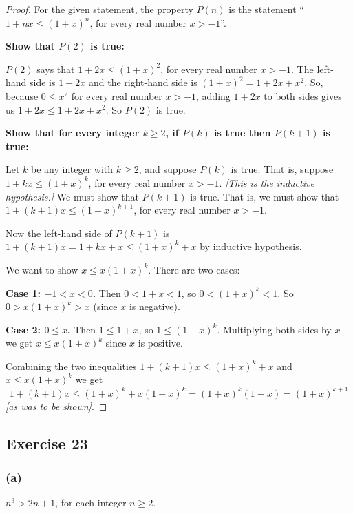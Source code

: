 \documentclass[14pt]{extarticle}
\begin{document}
\begin{proof}
    For the given statement, the property $P(n)$ is the statement ``$1 + nx \leq (1 + x)^n$, for every real number $x > -1$''.

    {\bf Show that $P(2)$ is true:}

    $P(2)$ says that $1 + 2x \leq (1 + x)^2$, for every real number $x > -1$. The left-hand side is $1 + 2x$ and the right-hand side is $(1+x)^2 = 1 + 2x + x^2$. So, because $0 \leq x^2$ for every real number $x > -1$, adding $1 + 2x$ to both sides gives us $1 + 2x \leq 1 + 2x + x^2$. So $P(2)$ is true.

        {\bf Show that for every integer $k \geq 2$, if $P(k)$ is true then $P(k + 1)$ is true:}

    Let $k$ be any integer with $k \geq 2$, and suppose $P(k)$ is true. That is, suppose $1 + kx \leq (1 + x)^k$, for every real number $x > -1$. {\it [This is the inductive hypothesis.]} We must show that $P(k + 1)$ is true. That is, we must show that $1 + (k + 1)x \leq (1 + x)^{k + 1}$, for every real number $x > -1$.

    Now the left-hand side of $P(k+1)$ is $1 + (k + 1)x = 1 + kx + x \leq (1 + x)^k + x$ by inductive hypothesis.

    We want to show $x \leq x(1+x)^k$. There are two cases:

    {\bf Case 1: $-1 < x < 0$.} Then $0 < 1 + x < 1$, so $0 < (1+x)^k < 1$. So $0 > x(1+x)^k > x$ (since $x$ is negative).

        {\bf Case 2: $0 \leq x$.} Then $1 \leq 1+x$, so $1 \leq (1 + x)^k$. Multiplying both sides by $x$ we get $x \leq x(1 + x)^k$ since $x$ is positive.

    Combining the two inequalities $1 + (k + 1)x \leq (1 + x)^k + x$ and $x \leq x(1 + x)^k$ we get
    \[
        1 + (k + 1)x \leq (1 + x)^k + x(1 + x)^k = (1 + x)^k (1 + x) = (1 + x)^{k + 1}
    \]
    {\it [as was to be shown]}.
\end{proof}

\subsection{Exercise 23}

\subsubsection{(a)}
$n^3 > 2n + 1$, for each integer $n \geq 2$.
\end{document}
